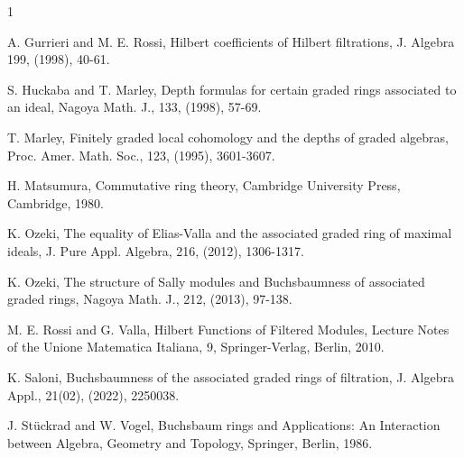 \documentclass[11pt,reqno]{amsart}
\theoremstyle{definition}
\numberwithin{equation}{section}
\begin{document}
\begin{thebibliography}{1}

 A. Gurrieri and M. E. Rossi, Hilbert coefficients of Hilbert filtrations, J. Algebra 199, (1998), 40-61.

 S. Huckaba and T. Marley, Depth formulas for certain graded rings associated to an ideal, Nagoya Math. J., 133, (1998), 57-69.




 T. Marley, Finitely graded local cohomology and the depths of graded algebras, Proc. Amer. Math. Soc., 123, (1995),  3601-3607.

 H. Matsumura, Commutative ring theory, Cambridge University Press, Cambridge, 1980.


 K. Ozeki, The equality of Elias-Valla and the associated graded ring of maximal ideals, J. Pure Appl. Algebra, 216, (2012), 1306-1317.

 K. Ozeki, The structure of Sally modules and Buchsbaumness of associated graded rings, Nagoya Math. J., 212, (2013), 97-138.

 M. E. Rossi and G. Valla, Hilbert Functions of Filtered Modules, Lecture Notes of the Unione Matematica Italiana, 9, Springer-Verlag, Berlin, 2010. 

 K. Saloni,  Buchsbaumness of the associated graded rings of filtration, J. Algebra Appl., 21(02), (2022), 2250038. %

 J. St\"uckrad and W. Vogel,  Buchsbaum rings and Applications: An Interaction between Algebra, Geometry and Topology, Springer, Berlin, 1986.



\end{thebibliography}
\end{document}
